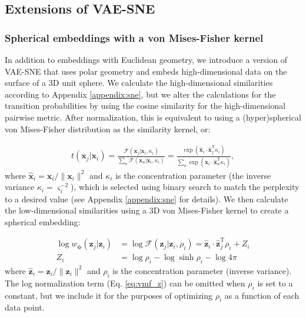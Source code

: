 \documentclass[11pt,a4paper,oneside]{book}
\begin{document}
\begin{appendices}
\subsection{Extensions of VAE-SNE}
\label{appendix:extensions}
\subsubsection{Spherical embeddings with a von Mises-Fisher kernel}
\label{appendix:spherical}
In addition to embeddings with Euclidean geometry, we introduce a version of VAE-SNE that uses polar geometry and embeds high-dimensional data on the surface of a 3D unit sphere. We calculate the high-dimensional similarities according to Appendix \ref{appendix:sne}, but we alter the calculations for the transition probabilities by using the cosine similarity for the high-dimensional pairwise metric. After normalization, this is equivalent to using a (hyper)spherical von Mises-Fisher distribution as the similarity kernel, or:

\begin{align}
     t(\mathbf{x}_j | \mathbf{x}_i) = \frac{\mathcal{F}(\mathbf{x}_j | \mathbf{x}_i, \kappa_i)}{\sum_{n} \mathcal{F}(\mathbf{x}_n | \mathbf{x}_i, \kappa_i)} = \frac{\exp \left(\mathbf{\hat{x}}_i \cdot \mathbf{\hat{x}}_j^{\mathrm{T}} \kappa_i \right)}{\sum_{n} \exp \left(\mathbf{\hat{x}}_i \cdot \mathbf{\hat{x}}_n^{\mathrm{T}} \kappa_i\right)},
\end{align}
where $\mathbf{\hat{x}}_i = \mathbf{x}_i / \|\mathbf{x}_i\|^2$ and $\kappa_i$ is the concentration parameter (the inverse variance $\kappa_i = \varsigma_i^{-2}$), which is selected using binary search to match the perplexity to a desired value (see Appendix \ref{appendix:sne} for details). We then calculate the low-dimensional similarities using a 3D von Mises-Fisher kernel to create a spherical embedding:

\begin{subequations}
    \begin{align}
        \log w_{\boldsymbol{\phi}}(\mathbf{z}_j | \mathbf{z}_i) &= \log \mathcal{F}(\mathbf{z}_j | \mathbf{z}_i, \rho_i) = \mathbf{\hat{z}}_i \cdot \mathbf{\hat{z}}_j^{\mathrm{T}} \rho_i + Z_i \label{eq:vmf_logp}\\
        Z_i &= \log\rho_i - \log\sinh{\rho_i} - \log4\pi \label{eq:vmf_z}
\end{align}
\end{subequations}
where $\mathbf{\hat{z}}_i = \mathbf{z}_i / \|\mathbf{z}_i\|^2$ and $\rho_i$ is the concentration parameter (inverse variance). The log normalization term (Eq. \ref{eq:vmf_z})  can be omitted when $\rho_i$ is set to a constant, but we include it for the purposes of optimizing $\rho_i$ as a function of each data point.


\end{appendices}
\end{document}
